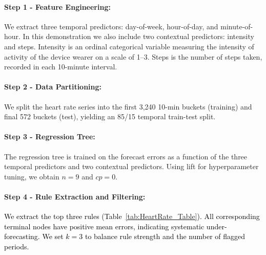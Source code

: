 \documentclass[]{interact}
\theoremstyle{plain}
\theoremstyle{definition}
\theoremstyle{remark}
\newcommand{\matt}[1]{\textcolor{black}{#1}}
\begin{document}
\paragraph{Step 1 - Feature Engineering:}
We extract three temporal predictors: day-of-week, hour-of-day, and minute-of-hour. In this
demonstration we also include two contextual predictors: intensity and steps. Intensity is
an ordinal categorical variable measuring the intensity of activity of the device wearer on
a scale of 1--3. Steps is the number of steps taken, recorded in each 10-minute interval.

\paragraph{Step 2 - Data Partitioning:}
We split the heart rate series into the first 3,240 10-min buckets (training) and final 572
buckets (test), yielding an 85/15 temporal train-test split.

\paragraph{Step 3 - Regression Tree:}
The regression tree is trained on the forecast errors as a function of the three temporal
predictors and two contextual predictors. Using lift for hyperparameter tuning, we obtain
$n = 9$ and $cp = 0$.

\paragraph{Step 4 - Rule Extraction and Filtering:}
\matt{We extract the top three rules (Table~\ref{tab:HeartRate_Table}). All corresponding
terminal nodes have positive mean errors, indicating systematic under-forecasting. We set
$k=3$ to balance rule strength and the number of flagged periods.}
\end{document}
